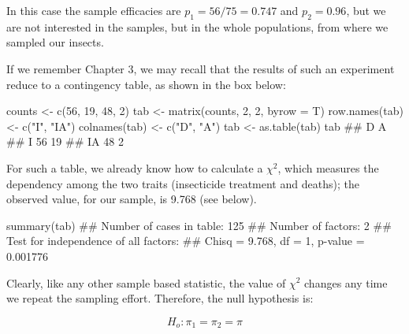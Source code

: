 \documentclass[a4paper,12pt,oneside]{book}
\newenvironment{Shaded}{\begin{snugshade}}{\end{snugshade}}
\newcommand{\DecValTok}[1]{#1}
\newcommand{\StringTok}[1]{#1}
\newcommand{\DocumentationTok}[1]{#1}
\newcommand{\OtherTok}[1]{#1}
\newcommand{\FunctionTok}[1]{#1}
\newcommand{\AttributeTok}[1]{#1}
\newcommand{\NormalTok}[1]{#1}
\begin{document}
In this case the sample efficacies are \(p_1 = 56/75 = 0.747\) and \(p_2 = 0.96\), but we are not interested in the samples, but in the whole populations, from where we sampled our insects.

If we remember Chapter 3, we may recall that the results of such an experiment reduce to a contingency table, as shown in the box below:

\begin{Shaded}
\begin{Highlighting}[]
\NormalTok{counts }\OtherTok{\textless{}{-}} \FunctionTok{c}\NormalTok{(}\DecValTok{56}\NormalTok{, }\DecValTok{19}\NormalTok{, }\DecValTok{48}\NormalTok{, }\DecValTok{2}\NormalTok{)}
\NormalTok{tab }\OtherTok{\textless{}{-}} \FunctionTok{matrix}\NormalTok{(counts, }\DecValTok{2}\NormalTok{, }\DecValTok{2}\NormalTok{, }\AttributeTok{byrow =}\NormalTok{ T)}
\FunctionTok{row.names}\NormalTok{(tab) }\OtherTok{\textless{}{-}} \FunctionTok{c}\NormalTok{(}\StringTok{"I"}\NormalTok{, }\StringTok{"IA"}\NormalTok{)}
\FunctionTok{colnames}\NormalTok{(tab) }\OtherTok{\textless{}{-}} \FunctionTok{c}\NormalTok{(}\StringTok{"D"}\NormalTok{, }\StringTok{"A"}\NormalTok{)}
\NormalTok{tab }\OtherTok{\textless{}{-}} \FunctionTok{as.table}\NormalTok{(tab)}
\NormalTok{tab}
\DocumentationTok{\#\#     D  A}
\DocumentationTok{\#\# I  56 19}
\DocumentationTok{\#\# IA 48  2}
\end{Highlighting}
\end{Shaded}

For such a table, we already know how to calculate a \(\chi^2\), which measures the dependency among the two traits (insecticide treatment and deaths); the observed value, for our sample, is 9.768 (see below).

\begin{Shaded}
\begin{Highlighting}[]
\FunctionTok{summary}\NormalTok{(tab)}
\DocumentationTok{\#\# Number of cases in table: 125 }
\DocumentationTok{\#\# Number of factors: 2 }
\DocumentationTok{\#\# Test for independence of all factors:}
\DocumentationTok{\#\#  Chisq = 9.768, df = 1, p{-}value = 0.001776}
\end{Highlighting}
\end{Shaded}

Clearly, like any other sample based statistic, the value of \(\chi^2\) changes any time we repeat the sampling effort. Therefore, the null hypothesis is:

\[H_o :\pi_1  = \pi_2  = \pi\]
\end{document}
